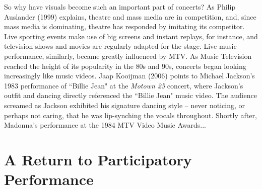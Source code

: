So why have visuals become such an important part of concerts? As Philip Auslander (1999) explains, theatre and mass media are in competition, and, since mass media is dominating, theatre has responded by imitating its competitor. Live sporting events make use of big screens and instant replays, for instance, and television shows and movies are regularly adapted for the stage. Live music performance, similarly, became greatly influenced by MTV. As Music Television reached the height of its popularity in the 80s and 90s, concerts began looking increasingly like music videos. Jaap Kooijman (2006) points to Michael Jackson's 1983 performance of ``Billie Jean" at the \textit{Motown 25} concert, where Jackson's outfit and dancing directly referenced the ``Billie Jean" music video. The audience screamed as Jackson exhibited his signature dancing style -- never noticing, or perhaps not caring, that he was lip-synching the vocals throughout. Shortly after, Madonna's performance at the 1984 MTV Video Music Awards...


\section{A Return to Participatory Performance}

